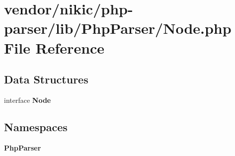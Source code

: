 \section{vendor/nikic/php-\/parser/lib/\+Php\+Parser/\+Node.php File Reference}
\label{nikic_2php-parser_2lib_2_php_parser_2_node_8php}
\subsection*{Data Structures}
\begin{DoxyCompactItemize}
\item 
interface {\bf Node}
\end{DoxyCompactItemize}
\subsection*{Namespaces}
\begin{DoxyCompactItemize}
\item 
 {\bf Php\+Parser}
\end{DoxyCompactItemize}
